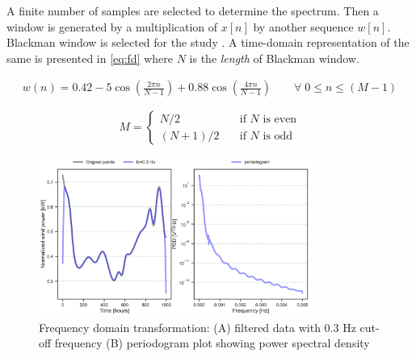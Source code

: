 A finite number of samples are selected to determine the spectrum. Then a window is generated by a multiplication of $x[n]$ by another sequence $w[n]$. Blackman window is selected for the study \cite{agarwal2014mathematical}. A time-domain representation of the same is presented in \eqref{eq:fd} where $N$ is the \textit{length} of Blackman window.

\begin{align} \label{eq:fd}
    w(n) = 0.42 - 5 \cos \left( \frac{2 \pi n}{N-1} \right) +0.88 \cos \left( \frac{4 \pi n}{N - 1} \right) \qquad \forall \; 0 \leq n \leq (M-1) 
\end{align}

\[
 M =
  \begin{cases}
    N/2       & \quad \text{if } N \text{ is even}\\
    (N+1)/2  & \quad \text{if } N \text{ is odd}
  \end{cases}
\]


\begin{figure}[!htbp]
 \centering
    \includegraphics[width=0.8\textwidth]{./sec/fig/Time-to-freq_plot.pdf}
    \caption{Frequency domain transformation: (A) filtered data with 0.3 Hz cut-off frequency (B) periodogram plot showing power spectral density}
    \label{fig:fft}
\end{figure}



